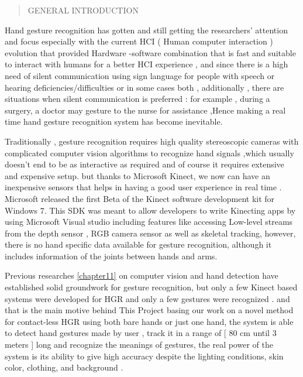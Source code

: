 \begin{quote}
 
\centering

    {
\huge 

GENERAL  INTRODUCTION 

}
\end{quote}


\vspace{1.5cm}

Hand gesture recognition  has gotten and still getting the researchers' attention and focus especially with the current HCI ( Human computer interaction ) evolution that provided Hardware -software  combination that is fast and suitable to interact with humans for a better HCI experience , and since there is a high need of silent communication using sign language for people with speech or  hearing  deficiencies/difficulties or in some cases both , additionally , there are situations when silent communication is preferred : for example , during a surgery,  a doctor may gesture to the nurse for assistance ,Hence making a real time  hand gesture recognition system has become inevitable.

Traditionally , gesture recognition requires high quality stereoscopic cameras with complicated computer vision algorithms to recognize hand signals ,which usually doesn't end to be as interactive as required and of course it requires extensive and expensive setup. but thanks to Microsoft  Kinect, we now can have  an inexpensive  sensors  that helps in having a good user experience in real time .\\
Microsoft released the first Beta of the Kinect software development kit for Windows 7. This SDK was meant to allow developers to write Kinecting apps by using Microsoft Visual studio including features like accessing Low-level streams from the depth sensor , RGB camera sensor   as well as skeletal  tracking, however,  there  is no hand  specific  data  available for  gesture   recognition,   although    it   includes   information  of the  joints   between  hands   and  arms.

 Previous   researches  \ref{chapter11}  on  computer   vision  and  hand   detection    have established    solid  groundwork    for  gesture   recognition, but  only  a  few  Kinect based   systems   were  developed   for  HGR    and  only  a  few  gestures were  recognized . and that is  the main motive behind This Project  basing our work on a novel method for contact-less HGR using both bare hands or just  one hand, the system is able to detect hand  gestures  made by user  , track it  in a range of [ 80 cm until 3 meters ] long  and  recognize the meanings of gestures, the real power of the system is its ability to give high accuracy  despite the lighting  conditions,   skin color, clothing,  and background  .

